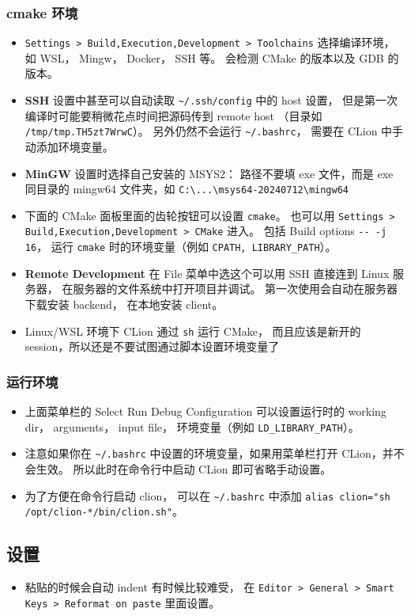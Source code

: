 \subsubsection{cmake 环境}
\begin{itemize}
\item \verb`Settings > Build,Execution,Development > Toolchains` 选择编译环境， 如 WSL， Mingw， Docker， SSH 等。 会检测 CMake 的版本以及 GDB 的版本。
\item \textbf{SSH} 设置中甚至可以自动读取 \verb`~/.ssh/config` 中的 host 设置， 但是第一次编译时可能要稍微花点时间把源码传到 remote host （目录如 \verb`/tmp/tmp.TH5zt7WrwC`）。 另外仍然不会运行 \verb`~/.bashrc`， 需要在 CLion 中手动添加环境变量。
\item \textbf{MinGW} 设置时选择自己安装的 MSYS2： 路径不要填 exe 文件，而是 exe 同目录的 mingw64 文件夹，如 \verb`C:\...\msys64-20240712\mingw64`
\item 下面的 CMake 面板里面的齿轮按钮可以设置 \verb`cmake`。 也可以用 \verb`Settings > Build,Execution,Development > CMake` 进入。 包括 Build options \verb`-- -j 16`， 运行 \verb`cmake` 时的环境变量（例如 \verb`CPATH, LIBRARY_PATH`）。
\item \textbf{Remote Development} 在 File 菜单中选这个可以用 SSH 直接连到 Linux 服务器， 在服务器的文件系统中打开项目并调试。 第一次使用会自动在服务器下载安装 backend， 在本地安装 client。
\item Linux/WSL 环境下 CLion 通过 \verb`sh` 运行 CMake， 而且应该是新开的 session，所以还是不要试图通过脚本设置环境变量了
\end{itemize}

\subsubsection{运行环境}
\begin{itemize}
\item 上面菜单栏的 Select Run Debug Configuration 可以设置运行时的 working dir， arguments， input file， 环境变量（例如 \verb`LD_LIBRARY_PATH`）。
\item 注意如果你在 \verb`~/.bashrc` 中设置的环境变量，如果用菜单栏打开 CLion，并不会生效。 所以此时在命令行中启动 CLion 即可省略手动设置。
\item 为了方便在命令行启动 clion， 可以在 \verb`~/.bashrc` 中添加 \verb`alias clion="sh /opt/clion-*/bin/clion.sh"`。
\end{itemize}

\subsection{设置}
\begin{itemize}
\item 粘贴的时候会自动 indent 有时候比较难受， 在 \verb`Editor > General > Smart Keys > Reformat on paste` 里面设置。
\end{itemize}
